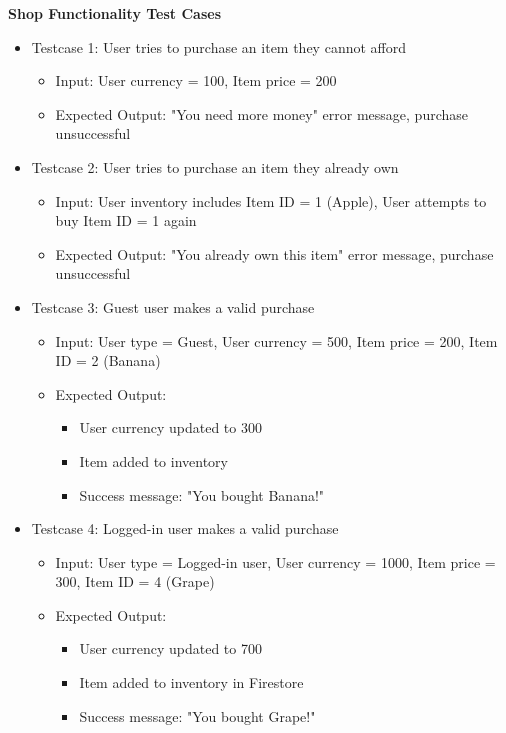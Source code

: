 \noindent
\textbf{Shop Functionality Test Cases}
\begin{itemize}
    \item Testcase 1: User tries to purchase an item they cannot afford
    \begin{itemize}
        \item Input: User currency = 100, Item price = 200
        \item Expected Output: "You need more money" error message, purchase unsuccessful
    \end{itemize}

    \item Testcase 2: User tries to purchase an item they already own
    \begin{itemize}
        \item Input: User inventory includes Item ID = 1 (Apple), User attempts to buy Item ID = 1 again
        \item Expected Output: "You already own this item" error message, purchase unsuccessful
    \end{itemize}

    \item Testcase 3: Guest user makes a valid purchase
    \begin{itemize}
        \item Input: User type = Guest, User currency = 500, Item price = 200, Item ID = 2 (Banana)
        \item Expected Output:
        \begin{itemize}
            \item User currency updated to 300
            \item Item added to inventory
            \item Success message: "You bought Banana!"
        \end{itemize}
    \end{itemize}

    \item Testcase 4: Logged-in user makes a valid purchase
    \begin{itemize}
        \item Input: User type = Logged-in user, User currency = 1000, Item price = 300, Item ID = 4 (Grape)
        \item Expected Output:
        \begin{itemize}
            \item User currency updated to 700
            \item Item added to inventory in Firestore
            \item Success message: "You bought Grape!"
        \end{itemize}
    \end{itemize}


\end{itemize}
